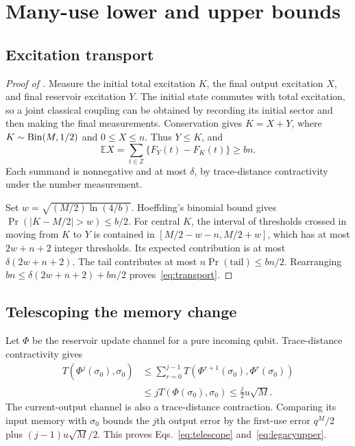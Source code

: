 \section{Many-use lower and upper bounds}\label{app:transport}
\subsection{Excitation transport}
\begin{proof}[Proof of ]
Measure the initial total excitation $K$, the final output excitation $X$, and final reservoir excitation $Y$. The initial state commutes with total excitation, so a joint classical coupling can be obtained by recording its initial sector and then making the final measurements. Conservation gives $K=X+Y$, where $K\sim\operatorname{Bin}(M,1/2)$ and $0\le X\le n$. Thus $Y\le K$, and
\begin{equation}
 \mathbb E X=\sum_{t\in\mathbb Z}\{F_Y(t)-F_K(t)\}\ge bn.
\end{equation}
Each summand is nonnegative and at most $\delta$, by trace-distance contractivity under the number measurement.

Set $w=\sqrt{(M/2)\ln(4/b)}$. Hoeffding's binomial bound gives $\Pr(|K-M/2|>w)\le b/2$. For central $K$, the interval of thresholds crossed in moving from $K$ to $Y$ is contained in $[M/2-w-n,M/2+w]$, which has at most $2w+n+2$ integer thresholds. Its expected contribution is at most $\delta(2w+n+2)$. The tail contributes at most $n\Pr(\text{tail})\le bn/2$. Rearranging $bn\le\delta(2w+n+2)+bn/2$ proves~\eqref{eq:transport}.
\end{proof}

\subsection{Telescoping the memory change}
Let $\Phi$ be the reservoir update channel for a pure incoming qubit. Trace-distance contractivity gives
\begin{align}
 T(\Phi^j(\sigma_0),\sigma_0)
 &\le\sum_{r=0}^{j-1}T(\Phi^{r+1}(\sigma_0),\Phi^r(\sigma_0))\nonumber\\
 &\le j T(\Phi(\sigma_0),\sigma_0)
 \le \tfrac j2 u\sqrt M.
\end{align}
The current-output channel is also a trace-distance contraction. Comparing its input memory with $\sigma_0$ bounds the $j$th output error by the first-use error $q^M/2$ plus $(j-1)u\sqrt M/2$. This proves Eqs.~\eqref{eq:telescope} and~\eqref{eq:legacyupper}.

